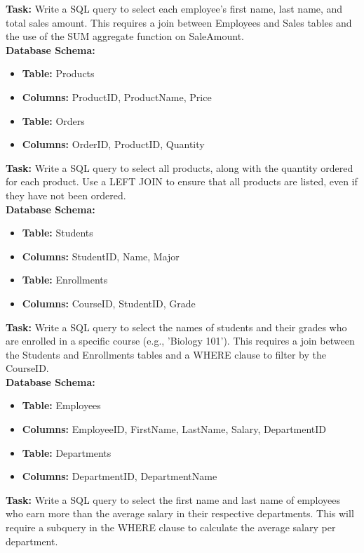 \noindent \textbf{Task:} Write a SQL query to select each employee's first name, last name, and total sales amount. This requires a join between Employees and Sales tables and the use of the SUM aggregate function on SaleAmount.\\

\noindent \textbf{Database Schema:}
\begin{itemize}
    \item \textbf{Table:} Products
    \item \textbf{Columns:} ProductID, ProductName, Price
    \item \textbf{Table:} Orders
    \item \textbf{Columns:} OrderID, ProductID, Quantity
\end{itemize}

\noindent \textbf{Task:} Write a SQL query to select all products, along with the quantity ordered for each product. Use a LEFT JOIN to ensure that all products are listed, even if they have not been ordered.\\

\noindent \textbf{Database Schema:}
\begin{itemize}
    \item \textbf{Table:} Students
    \item \textbf{Columns:} StudentID, Name, Major
    \item \textbf{Table:} Enrollments
    \item \textbf{Columns:} CourseID, StudentID, Grade
\end{itemize}

\noindent \textbf{Task:} Write a SQL query to select the names of students and their grades who are enrolled in a specific course (e.g., 'Biology 101'). This requires a join between the Students and Enrollments tables and a WHERE clause to filter by the CourseID.\\

\noindent \textbf{Database Schema:} 
\begin{itemize}
    \item \textbf{Table:} Employees
    \item \textbf{Columns:} EmployeeID, FirstName, LastName, Salary, DepartmentID
    \item \textbf{Table:} Departments
    \item \textbf{Columns:} DepartmentID, DepartmentName
\end{itemize}

\noindent \textbf{Task:} Write a SQL query to select the first name and last name of employees who earn more than the average salary in their respective departments. This will require a subquery in the WHERE clause to calculate the average salary per department.\\

